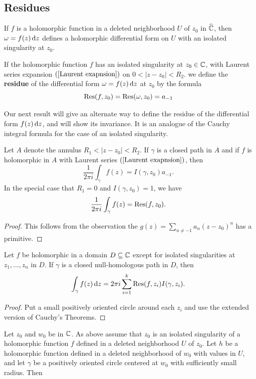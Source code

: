 \subsection{Residues}
If $f$ is a holomorphic function in a deleted neighborhood $U$ of $z_0$ in $\widehat{\mathbb{C}}$, then $\omega=f(z)\mathop{}\!\mathrm{d} z$ defines a holomorphic differential form on $U$ with an isolated singularity at $z_0$.
\begin{definition}
If the holomorphic function $f$ has an isolated singularity at $z_0\in\mathbb{C}$,
with Laurent series expansion $(\ref{Laurent exapnsion})$ on $0<|z-z_0|<R_2$. we define the \textbf{residue} of the differential form $\omega=f(z)\mathop{}\!\mathrm{d} z$ at $z_0$ by the formula
\[\mathrm{Res}(f,z_0)=\mathrm{Res}(\omega,z_0)=a_{-1}\]
\end{definition}
Our next result will give an alternate way to define the residue of the differential form $f(z)\mathop{}\!\mathrm{d} z$, and will show its invariance. It is an analogue of the Cauchy integral formula for the case of an isolated singularity.
\begin{theorem}
Let $A$ denote the annulus $R_1<|z-z_0|<R_2$. If $\gamma$ is a closed path in $A$ and if $f$ is holomorphic in $A$ with Laurent series $(\ref{Laurent exapnsion})$, then
\[\frac{1}{2\pi i}\int_{\gamma}f(z)=I(\gamma,z_0)a_{-1}.\]
In the special case that $R_1=0$ and $I(\gamma,z_0)=1$, we have
\[\frac{1}{2\pi i}\int_{\gamma}f(z)=\mathrm{Res}(f,z_0).\]
\end{theorem}
\begin{proof}
This follows from the observation the $g(z)=\sum_{n\neq -1}a_n(z-z_0)^n$ has a primitive.
\end{proof}
\begin{theorem}
Let $f$ be holomorphic in a domain $D\subseteq\mathbb{C}$ except for isolated singularities at $z_1,\dots,z_n$ in $D$. If $\gamma$ is a closed null-homologous path in $D$, then
\[\int_{\gamma}f(z)\mathop{}\!\mathrm{d} z=2\pi i\sum_{i=1}^{k}\mathrm{Res}(f,z_i)I(\gamma,z_i).\]
\end{theorem}
\begin{proof}
Put a small positively oriented circle around each $z_i$ and use the extended version of Cauchy's Theorems.
\end{proof}
Let $z_0$ and $w_0$ be in $\mathbb{C}$. As above assume that $z_0$ is an isolated singularity of a holomorphic function $f$ defined in a deleted neighborhood $U$ of $z_0$. Let $h$ be a holomorphic function defined in a deleted neighborhood of $w_0$ with values in $U$, and let $\gamma$ be a positively oriented circle centered at $w_0$ with sufficiently small radius. Then
